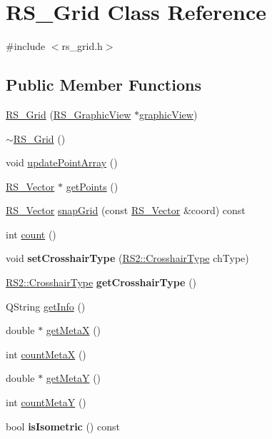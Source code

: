 \hypertarget{classRS__Grid}{\section{R\-S\-\_\-\-Grid Class Reference}
\label{classRS__Grid}
}


{\ttfamily \#include $<$rs\-\_\-grid.\-h$>$}

\subsection*{Public Member Functions}
\begin{DoxyCompactItemize}
\item 
\hyperlink{classRS__Grid_a24bdfec46f770676c3bb0b6b837669e2}{R\-S\-\_\-\-Grid} (\hyperlink{classRS__GraphicView}{R\-S\-\_\-\-Graphic\-View} $\ast$\hyperlink{classRS__Grid_aaf666d44cca6b7efdaba71632e4823f7}{graphic\-View})
\item 
\hyperlink{classRS__Grid_ae660c4bc4cd66a4b24eb40d6acc9687c}{$\sim$\-R\-S\-\_\-\-Grid} ()
\item 
void \hyperlink{classRS__Grid_ab9bc75e8cdb45fcc2e6a0a912021de03}{update\-Point\-Array} ()
\item 
\hyperlink{classRS__Vector}{R\-S\-\_\-\-Vector} $\ast$ \hyperlink{classRS__Grid_af2f47b7e834388ee3955ff258f406e61}{get\-Points} ()
\item 
\hyperlink{classRS__Vector}{R\-S\-\_\-\-Vector} \hyperlink{classRS__Grid_a314100d3772b4c815eb82074a7ea68f1}{snap\-Grid} (const \hyperlink{classRS__Vector}{R\-S\-\_\-\-Vector} \&coord) const 
\item 
int \hyperlink{classRS__Grid_a8810cbe32e04eafd5d15cb2c7dcf7c5d}{count} ()
\item 
\hypertarget{classRS__Grid_ae7d9ef6014cd9b0fbe3d1d3968d78619}{void {\bfseries set\-Crosshair\-Type} (\hyperlink{classRS2_a6900d729544a78e6cda74f93df772acc}{R\-S2\-::\-Crosshair\-Type} ch\-Type)}\label{classRS__Grid_ae7d9ef6014cd9b0fbe3d1d3968d78619}

\item 
\hypertarget{classRS__Grid_a9929007b56bb3f1599a45cdd061cbad9}{\hyperlink{classRS2_a6900d729544a78e6cda74f93df772acc}{R\-S2\-::\-Crosshair\-Type} {\bfseries get\-Crosshair\-Type} ()}\label{classRS__Grid_a9929007b56bb3f1599a45cdd061cbad9}

\item 
Q\-String \hyperlink{classRS__Grid_ae99e808295c900295f4b58b59c4cb59c}{get\-Info} ()
\item 
double $\ast$ \hyperlink{classRS__Grid_a47d6a6c1219f8824811f9f6a695d1f71}{get\-Meta\-X} ()
\item 
int \hyperlink{classRS__Grid_a9f98ba071ec1be2ef749f242ebd106fe}{count\-Meta\-X} ()
\item 
double $\ast$ \hyperlink{classRS__Grid_adcf690d0f189301b656e12b5bc6e4602}{get\-Meta\-Y} ()
\item 
int \hyperlink{classRS__Grid_a38a3e3fc37647df7719faa84eac05d6a}{count\-Meta\-Y} ()
\item 
\hypertarget{classRS__Grid_ab54df94e5fc50f86bc89f35476670da8}{bool {\bfseries is\-Isometric} () const }\label{classRS__Grid_ab54df94e5fc50f86bc89f35476670da8}


\end{DoxyCompactItemize}
